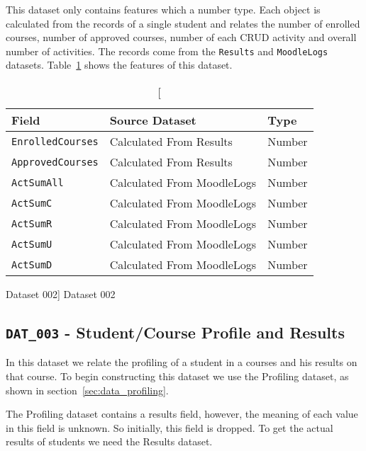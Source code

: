 This dataset only contains features which a number type. Each object is
calculated from the records of a single student and relates the number of
enrolled courses, number of approved courses, number of each CRUD activity and
overall number of activities. The records come from the \texttt{Results} and
\texttt{MoodleLogs} datasets. Table~\ref{tab:dat_002} shows the features of
this dataset.

\begin{table}[h!]
    \centering

    \begin{tabular}{| l | l | l |}
        \hline
        \textbf{Field}           & \textbf{Source Dataset}    & \textbf{Type} \\ \hline
        \texttt{EnrolledCourses} & Calculated From Results    & Number        \\ \hline
        \texttt{ApprovedCourses} & Calculated From Results    & Number        \\ \hline
        \texttt{ActSumAll}       & Calculated From MoodleLogs & Number        \\ \hline
        \texttt{ActSumC}         & Calculated From MoodleLogs & Number        \\ \hline
        \texttt{ActSumR}         & Calculated From MoodleLogs & Number        \\ \hline
        \texttt{ActSumU}         & Calculated From MoodleLogs & Number        \\ \hline
        \texttt{ActSumD}         & Calculated From MoodleLogs & Number        \\ \hline
    \end{tabular}

    \caption
        [Dataset 002]
        {Dataset 002}

    \label{tab:dat_002}
\end{table}

\subsection{\texttt{DAT\_003} - Student/Course Profile and Results}
\label{sec:dat_003}

In this dataset we relate the profiling of a student in a courses and his
results on that course. To begin constructing this dataset we use the Profiling
dataset, as shown in section~\ref{sec:data_profiling}.

The Profiling dataset contains a results field, however, the meaning of each
value in this field is unknown. So initially, this field is dropped. To get the
actual results of students we need the Results dataset.


